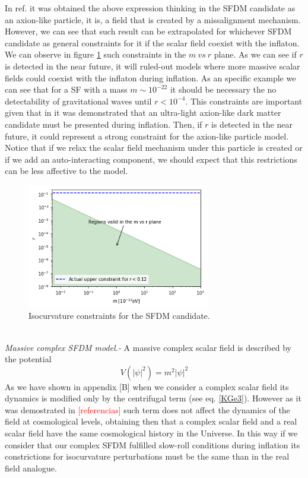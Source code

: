\documentclass[amssymb,twocolumn,prd,nofootinbib,showpacs]{revtex4-1}
\begin{document}
In ref. \cite{SFrev2}
it was obtained the above expression thinking in the SFDM candidate as an axion-like particle, it is, a field that is created by a missalignment mechanism. However, we can see that such result can be extrapolated for whichever SFDM candidate as general constraints for it if the scalar field coexist with the inflaton. We can observe in figure \ref{constraintsSFDM} such constraints in the $m\ vs\ r$ plane. As we can see if $r$ is detected in the near future, it will ruled-out models where more massive scalar fields could coexist with the inflaton during inflation. As an specific example we can see that for a SF with a mass $m\sim 10^{-22}$ it should be necessary the no detectability of gravitational waves until $r< 10^{-4}$. This constraints are important given that in \cite{laldm} it was demonstrated that an ultra-light axion-like dark matter candidate must be presented during inflation. Then, if $r$ is detected in the near future, it could represent a strong constraint for the axion-like particle model. Notice that if we relax the scalar field mechanism under this particle is created or if we add an auto-interacting component, we should expect that this restrictions can be less affective to the model. 
\begin{figure}
\includegraphics[width=8cm]{SFDMconstraints.png}
\caption{Isocurvature constraints for the SFDM candidate.}\label{constraintsSFDM}
\end{figure}\\

\textit{Massive complex SFDM model.-} A massive complex scalar field is described by the potential
\begin{equation}
V(|\psi|^2)= m^2|\psi|^2
\end{equation}
As we have shown in appendix [B] when we consider a complex scalar field its dynamics is modified only by the centrifugal term (see eq. \eqref{KGe3}). However as it was demostrated in \textcolor{red}{[referencias]} such term does not affect the dynamics of the field at cosmological levels, obtaining then that a complex scalar field and a real scalar field have the same cosmological history in the Universe. In this way if we consider that our complex SFDM fulfilled slow-roll conditions during inflation its constrictions for isocurvature perturbations must be the same than in the real field analogue. \\
\end{document}
